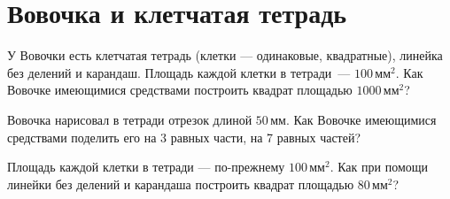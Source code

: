 \section{Вовочка и клетчатая тетрадь}
\begin{itemize}

\itA У Вовочки есть клетчатая тетрадь (клетки — одинаковые, квадратные), линейка без делений и карандаш. Площадь каждой клетки в тетради~— $100\,\text{мм}^2$. Как Вовочке имеющимися средствами построить квадрат площадью $1000\,\text{мм}^2$?

\itB Вовочка нарисовал в тетради отрезок длиной $50\,\text{мм}$. Как Вовочке имеющимися средствами поделить его на 3 равных части, на 7 равных частей?

\itC Площадь каждой клетки в тетради — по-прежнему $100\,\text{мм}^2$. Как при помощи линейки без делений и карандаша построить квадрат площадью $80\,\text{мм}^2$?
\end{itemize}